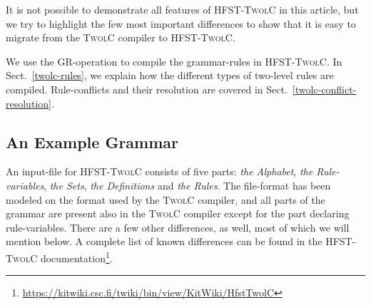 \documentclass[postprint]{flammie}
\begin{document}
It is not possible to demonstrate all features of \textsc{HFST-TwolC}
in this article, but we try to highlight the few most important
differences to show that it is easy to migrate from the \textsc{TwolC}
compiler to \textsc{HFST-TwolC}.

We use the GR-operation to compile the grammar-rules in
\textsc{HFST-TwolC}. In Sect.~\ref{twolc-rules}, we explain how the
different types of two-level rules are compiled. Rule-conflicts and
their resolution are covered in Sect.~\ref{twolc-conflict-resolution}.

\subsection{An Example Grammar}\label{twolc-example}

An input-file for \textsc{HFST-TwolC} consists of five parts:
\textit{the Alphabet}, \textit{the Rule-variables}, \textit{the Sets},
\textit{the Definitions} and \textit{the Rules}. The file-format has
been modeled on the format used by the \textsc{TwolC} compiler, and
all parts of the grammar are present also in the \textsc{TwolC}
compiler except for the part declaring rule-variables. There are a few
other differences, as well, most of which we will mention below. A
complete list of known differences can be found in the
\textsc{HFST-TwolC}
documentation\footnote{\url{https://kitwiki.csc.fi/twiki/bin/view/KitWiki/HfstTwolC}}.
\end{document}
